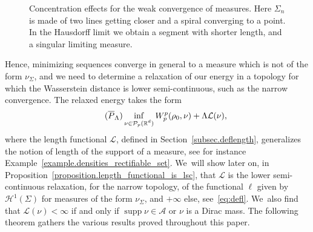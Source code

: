 \documentclass[JEP,XML,SOM,Unicode,NoFloatCountersInSection,published]{cedram}
\let\ts\textstyle
\theoremstyle{definition}
\newcommand\LM[1]{\hbox{\vrule width.5pt \vbox to#1pt{\vfill \hrule width#1pt height.5pt}}}
\newcommand\LL{{\mathchoice {\>\LM7\>}{\>\LM7\>}{\,\LM5\,}{\,\LM{3.35}\,}}}
\newcommand{\mres}{\LL}
\newcommand\cH{\mathcal{H}}
\newcommand{\RR}{\mathbb{R}}
\DeclareMathOperator{\supp}{supp}
\newcommand{\distH}{d_{\mathcal{H}}}
\begin{document}
\begin{figure}[t]
{
}
\caption{Concentration effects for the weak convergence of measures. Here $\Sigma_n$ is made of two lines getting closer and a spiral converging to a point. In the Hausdorff limit we obtain a segment with shorter length, and a singular limiting measure.}\label{figure.concentration_sets_measure}
\vspace*{-.1\baselineskip}
\end{figure}

Hence, minimizing sequences converge in general to a measure which is
not of the form $\nu_\Sigma$, and we need to determine a relaxation of our energy in a topology for which the Wasserstein distance is lower semi-continuous, such as the narrow convergence.
The relaxed energy takes the form
\begin{equation}\label{problem.shape_optimization_relaxed}
\tag{$\overline{P}_\Lambda$}
\inf_{
\substack{
\nu \in \mathcal{P}_p(\RR^d)
}
}
W_p^p(\rho_0, \nu) + \Lambda \mathcal{L}(\nu),
\end{equation}
where the length functional $\mathcal{L}$, defined in Section~\ref{subsec.deflength}, generalizes the notion of length of the support of a measure, see for instance Example~\ref{example.densities_rectifiable_set}. We~will show later on, in Proposition~\ref{proposition.length_functional_is_lsc},
that $\mathcal{L}$ is the lower semi-continuous relaxation, for the narrow topology, of the functional $\ell$ given by $\cH^1(\Sigma)$ for measures
of the form $\nu_\Sigma$, and $+\infty$ else, see~\eqref{eq:defl}. We~also find that $\mathcal{L}(\nu) < \infty$ if and only if $\supp \nu \in \mathcal{A}$ or $\nu$ is a Dirac mass. The following theorem gathers the various results proved throughout this paper.
\end{document}
